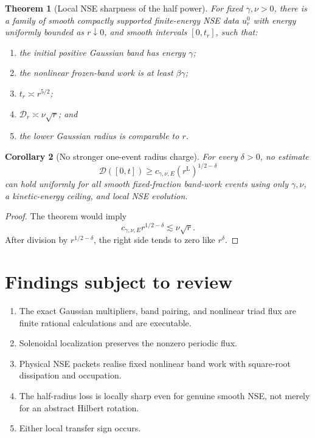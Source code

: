 \documentclass[11pt]{article}
\newtheorem{theorem}{Theorem}
\newtheorem{corollary}[theorem]{Corollary}
\theoremstyle{remark}
\newcommand{\Diss}{\mathcal{D}}
\begin{document}
\begin{theorem}[Local NSE sharpness of the half power]
For fixed \(\gamma,\nu>0\), there is a family of smooth compactly supported
finite-energy NSE data \(u_r^0\) with energy uniformly bounded as
\(r\downarrow0\), and smooth intervals \([0,t_r]\), such that:
\begin{enumerate}
\item the initial positive Gaussian band has energy \(\gamma\);
\item the nonlinear frozen-band work is at least \(\beta\gamma\);
\item \(t_r\asymp r^{5/2}\);
\item \(\Diss_r\asymp\nu\sqrt r\); and
\item the lower Gaussian radius is comparable to \(r\).
\end{enumerate}
\end{theorem}

\begin{corollary}[No stronger one-event radius charge]
For every \(\delta>0\), no estimate
\[
 \Diss([0,t])
 \ge
 c_{\gamma,\nu,E}(r^{\mathrm L})^{1/2-\delta}
\]
can hold uniformly for all smooth fixed-fraction band-work events using only
\(\gamma,\nu\), a kinetic-energy ceiling, and local NSE evolution.
\end{corollary}

\begin{proof}
The theorem would imply
\[
 c_{\gamma,\nu,E}r^{1/2-\delta}
 \lesssim\nu\sqrt r.
\]
After division by \(r^{1/2-\delta}\), the right side tends to zero like
\(r^\delta\).
\end{proof}

\section{Findings subject to review}

\begin{enumerate}
\item The exact Gaussian multipliers, band pairing, and nonlinear triad flux
are finite rational calculations and are executable.
\item Solenoidal localization preserves the nonzero periodic flux.
\item Physical NSE packets realise fixed nonlinear band work with
square-root dissipation and occupation.
\item The half-radius loss is locally sharp even for genuine smooth NSE,
not merely for an abstract Hilbert rotation.
\item Either local transfer sign occurs.
\end{enumerate}
\end{document}
